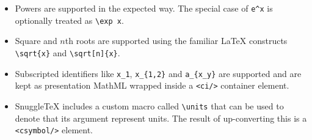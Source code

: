 \begin{itemize}

\item
  Powers are supported in the expected way. The special case of \verb|e^x|
  is optionally treated as \verb|\exp x|.

\item
  Square and $n$th roots are supported using the familiar LaTeX
  constructs \verb|\sqrt{x}| and \verb|\sqrt[n]{x}|.

\item
  Subscripted identifiers like \verb|x_1|, \verb|x_{1,2}|
  and \verb|a_{x_y}| are supported and are kept as presentation MathML wrapped
  inside a \verb|<ci/>| container element.

\item
  SnuggleTeX includes a custom macro called \verb|\units| that can be used
  to denote that its argument represent units. The result of up-converting
  this is a \verb|<csymbol/>| element.

\end{itemize}


